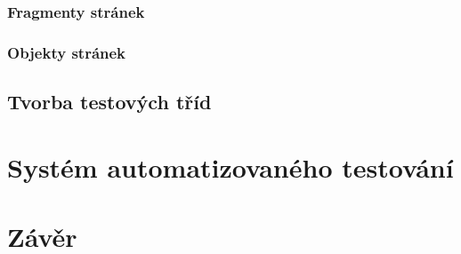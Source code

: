 \documentclass[
    color,   %
	table,   %
    twoside, %
]{fithesis3}
\begin{document}
\subsection{Fragmenty stránek}
\subsection{Objekty stránek}

\section{Tvorba testových tříd}

\chapter{Systém automatizovaného testování}
\chapter{Závěr}
\renewcommand{\refname}{Seznam literatury}
\end{document}
